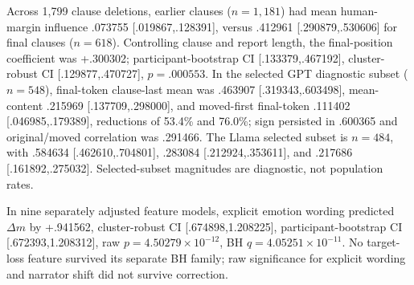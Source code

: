 \begin{table}[t]
\caption{Saved uncertainty for final-clause flip and target-loss prevalence by reported emotion. The unit is the report (618 reports from 174 participant clusters overall); within an emotion there is at most one report per participant. Intervals are percentile 95\% participant-bootstrap CIs from the archived clause audit. Per-emotion intervals for mean margin change and full-match prevalence were not archived and are therefore not supplied.}
\label{tab:app-clause-emotion-ci}
\centering
\scriptsize
{}
\end{table}


Across 1,799 clause deletions, earlier clauses ($n=1,181$) had mean human-margin influence .073755 [.019867,.128391], versus .412961 [.290879,.530606] for final clauses ($n=618$). Controlling clause and report length, the final-position coefficient was +.300302; participant-bootstrap CI [.133379,.467192], cluster-robust CI [.129877,.470727], $p=.000553$. In the selected GPT diagnostic subset ($n=548$), final-token clause-last mean was .463907 [.319343,.603498], mean-content .215969 [.137709,.298000], and moved-first final-token .111402 [.046985,.179389], reductions of 53.4\% and 76.0\%; sign persisted in .600365 and original/moved correlation was .291466. The Llama selected subset is $n=484$, with .584634 [.462610,.704801], .283084 [.212924,.353611], and .217686 [.161892,.275032]. Selected-subset magnitudes are diagnostic, not population rates.

In nine separately adjusted feature models, explicit emotion wording predicted $\Delta m$ by +.941562, cluster-robust CI [.674898,1.208225], participant-bootstrap CI [.672393,1.208312], raw $p=4.50279\times10^{-12}$, BH $q=4.05251\times10^{-11}$. No target-loss feature survived its separate BH family; raw significance for explicit wording and narrator shift did not survive correction.

